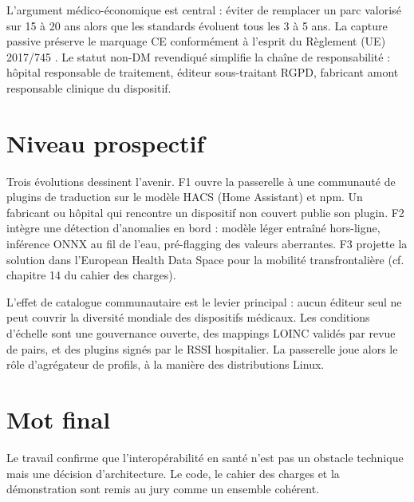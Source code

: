 L'argument médico-économique est central : éviter de remplacer un parc valorisé sur 15 à 20 ans alors que les standards évoluent tous les 3 à 5 ans. La capture passive préserve le marquage CE conformément à l'esprit du Règlement (UE) 2017/745 \cite{mdr_2017_745}. Le statut non-DM revendiqué simplifie la chaîne de responsabilité : hôpital responsable de traitement, éditeur sous-traitant RGPD, fabricant amont responsable clinique du dispositif.

\section*{Niveau prospectif}

Trois évolutions dessinent l'avenir. F1 ouvre la passerelle à une communauté de plugins de traduction sur le modèle HACS (Home Assistant) et npm. Un fabricant ou hôpital qui rencontre un dispositif non couvert publie son plugin. F2 intègre une détection d'anomalies en bord : modèle léger entraîné hors-ligne, inférence ONNX au fil de l'eau, pré-flagging des valeurs aberrantes. F3 projette la solution dans l'European Health Data Space pour la mobilité transfrontalière (cf. chapitre 14 du cahier des charges).

L'effet de catalogue communautaire est le levier principal : aucun éditeur seul ne peut couvrir la diversité mondiale des dispositifs médicaux. Les conditions d'échelle sont une gouvernance ouverte, des mappings LOINC validés par revue de pairs, et des plugins signés par le RSSI hospitalier. La passerelle joue alors le rôle d'agrégateur de profils, à la manière des distributions Linux.

\section*{Mot final}

Le travail confirme que l'interopérabilité en santé n'est pas un obstacle technique mais une décision d'architecture. Le code, le cahier des charges et la démonstration sont remis au jury comme un ensemble cohérent.
